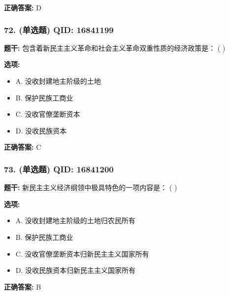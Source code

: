 \documentclass[12pt,UTF8]{ctexart}
\begin{document}
\textbf{正确答案:}
D

\vspace{0.3em}\hrulefill\vspace{0.7em}

\subsubsection*{72. (单选题) \small QID: 16841199}

\textbf{题干:}
包含着新民主主义革命和社会主义革命双重性质的经济政策是： ( )

\textbf{选项:}
\begin{itemize}[leftmargin=*]

  \item A. 没收封建地主阶级的土地

  \item B. 保护民族工商业

  \item C. 没收官僚垄断资本

  \item D. 没收民族资本

\end{itemize}

\textbf{正确答案:}
C

\vspace{0.3em}\hrulefill\vspace{0.7em}

\subsubsection*{73. (单选题) \small QID: 16841200}

\textbf{题干:}
新民主主义经济纲领中极具特色的一项内容是： ( )

\textbf{选项:}
\begin{itemize}[leftmargin=*]

  \item A. 没收封建地主阶级的土地归农民所有

  \item B. 保护民族工商业

  \item C. 没收官僚垄断资本归新民主主义国家所有

  \item D. 没收民族资本归新民主主义国家所有

\end{itemize}

\textbf{正确答案:}
B

\vspace{0.3em}\hrulefill\vspace{0.7em}
\end{document}
